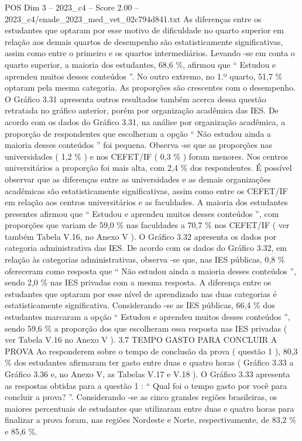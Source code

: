 \begin{textsample}{POS Dim 3 – 2023\_c4 – Score 2.00 – 2023\_c4/enade\_2023\_med\_vet\_02c794d841.txt}
As diferenças entre os estudantes que optaram por esse motivo de dificuldade no quarto superior em relação aos demais quartos de desempenho são estatisticamente significativas, assim como entre o primeiro e os quartos intermediários.
Levando -se em conta o quarto superior, a maioria dos estudantes, 68,6 \%, afirmou que “ Estudou e aprendeu muitos desses conteúdos ”.
No outro extremo, no 1.º quarto, 51,7 \% optaram pela mesma categoria.
As proporções são crescentes com o desempenho.
O Gráfico 3.31 apresenta outros resultados também acerca dessa questão retratada no gráfico anterior, porém por organização acadêmica das IES.
De acordo com os dados do Gráfico 3.31, na análise por organização acadêmica, a proporção de respondentes que escolheram a opção “ Não estudou ainda a maioria desses conteúdos ” foi pequena.
Observa -se que as proporções nas universidades ( 1,2 \% ) e nos CEFET/IF ( 0,3 \% ) foram menores.
Nos centros universitários a proporção foi mais alta, com 2,4 \% dos respondentes.
É possível observar que as diferenças entre as universidades e as demais organizações acadêmicas são estatisticamente significativas, assim como entre os CEFET/IF em relação aos centros universitários e as faculdades.
A maioria dos estudantes presentes afirmou que “ Estudou e aprendeu muitos desses conteúdos ”, com proporções que variam de 59,0 \% nas faculdades a 70,7 \% nos CEFET/IF ( ver também Tabela V.16, no Anexo V ).
O Gráfico 3.32 apresenta os dados por categoria administrativa das IES.
De acordo com os dados do Gráfico 3.32, em relação às categorias administrativas, observa -se que, nas IES públicas, 0,8 \% ofereceram como resposta que “ Não estudou ainda a maioria desses conteúdos ”, sendo 2,0 \% nas IES privadas com a mesma resposta.
A diferença entre os estudantes que optaram por esse nível de aprendizado nas duas categorias é estatisticamente significativa.
Considerando -se as IES públicas, 66,4 \% dos estudantes marcaram a opção “ Estudou e aprendeu muitos desses conteúdos ”, sendo 59,6 \% a proporção dos que escolheram essa resposta nas IES privadas ( ver Tabela V.16 no Anexo V ). 3.7 TEMPO GASTO PARA CONCLUIR A PROVA Ao responderem sobre o tempo de conclusão da prova ( questão 1 ), 80,3 \% dos estudantes afirmaram ter gasto entre duas e quatro horas ( Gráfico 3.33 a Gráfico 3.36 e, no Anexo V, as Tabelas V.17 e V.18 ).
O Gráfico 3.33 apresenta as respostas obtidas para a questão 1 : “ Qual foi o tempo gasto por você para concluir a prova? ”.
Considerando -se as cinco grandes regiões brasileiras, os maiores percentuais de estudantes que utilizaram entre duas e quatro horas para finalizar a prova foram, nas regiões Nordeste e Norte, respectivamente, de 83,2 \% e 85,6 \%.

\end{textsample}
